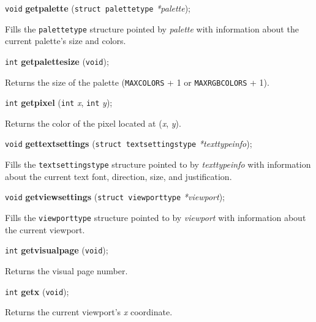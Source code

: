 \documentclass[a4paper,11pt]{article}
\newcommand{\V}{\texttt{void}}      %
\newcommand{\I}{\texttt{int}}       %
\newcommand{\func}[1]{\textbf{#1}}  %
\newcommand{\A}[1]{\emph{#1}}       %
\newcommand{\T}[1]{\texttt{#1}}     %
\newenvironment{bgi}
{ %
  \begin{snugshade}
}
{ %
  \end{snugshade}
}
\begin{document}
\begin{bgi}
\V{} \func{getpalette} (\texttt{struct palettetype} \A{*palette});
\end{bgi}

Fills the \texttt{palettetype} structure pointed by \A{palette} with
information about the current palette's size and colors.


\begin{bgi}
\I{} \func{getpalettesize} (\V{}); 
\end{bgi}

Returns the size of the palette (\T{MAXCOLORS} + 1 or
\T{MAXRGB\-COLORS} + 1).


\begin{bgi}
\I{} \func{getpixel} (\I{} \A{x}, \I{} \A{y});
\end{bgi}

Returns the color of the pixel located at (\A{x}, \A{y}).


\begin{bgi}
\V{} \func{gettextsettings} (\texttt{struct textsettingstype}
\A{*texttypeinfo});
\end{bgi}

Fills the \texttt{textsettingstype} structure pointed to by
\A{texttypeinfo} with information about the current text font,
direction, size, and justification.


\begin{bgi}
\V{} \func{getviewsettings} (\texttt{struct viewporttype} \A{*viewport});
\end{bgi}

Fills the \texttt{viewporttype} structure pointed to by \A{viewport}
with information about the current viewport.


\begin{bgi}
\I{} \func{getvisualpage} (\V{});
\end{bgi}

Returns the visual page number.


\begin{bgi}
\I{} \func{getx} (\V{});
\end{bgi}

Returns the current viewport's \A{x} coordinate.

\end{document}
